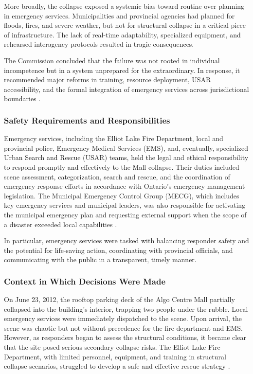 \documentclass[12pt]{article}
\begin{document}
More broadly, the collapse exposed a systemic bias toward routine over planning in emergency services. Municipalities and provincial agencies had planned for floods, fires, and severe weather, but not for structural collapse in a critical piece of infrastructure. The lack of real-time adaptability, specialized equipment, and rehearsed interagency protocols resulted in tragic consequences.

The Commission concluded that the failure was not rooted in individual incompetence but in a system unprepared for the extraordinary. In response, it recommended major reforms in training, resource deployment, USAR accessibility, and the formal integration of emergency services across jurisdictional boundaries \cite[p288–290]{AlgoLakeReport1}.

\subsubsection*{Safety Requirements and Responsibilities}

Emergency services, including the Elliot Lake Fire Department, local and provincial police, Emergency Medical Services (EMS), and, eventually, specialized Urban Search and Rescue (USAR) teams, held the legal and ethical responsibility to respond promptly and effectively to the Mall collapse. Their duties included scene assessment, categorization, search and rescue, and the coordination of emergency response efforts in accordance with Ontario’s emergency management legislation. The Municipal Emergency Control Group (MECG), which includes key emergency services and municipal leaders, was also responsible for activating the municipal emergency plan and requesting external support when the scope of a disaster exceeded local capabilities \cite[p282–284, 306–310]{AlgoLakeReport1}.

In particular, emergency services were tasked with balancing responder safety and the potential for life-saving action, coordinating with provincial officials, and communicating with the public in a transparent, timely manner.

\subsubsection*{Context in Which Decisions Were Made}

On June 23, 2012, the rooftop parking deck of the Algo Centre Mall partially collapsed into the building’s interior, trapping two people under the rubble. Local emergency services were immediately dispatched to the scene. Upon arrival, the scene was chaotic but not without precedence for the fire department and EMS. However, as responders began to assess the structural conditions, it became clear that the site posed serious secondary collapse risks. The Elliot Lake Fire Department, with limited personnel, equipment, and training in structural collapse scenarios, struggled to develop a safe and effective rescue strategy \cite[p282–286]{AlgoLakeReport1}.
\end{document}
